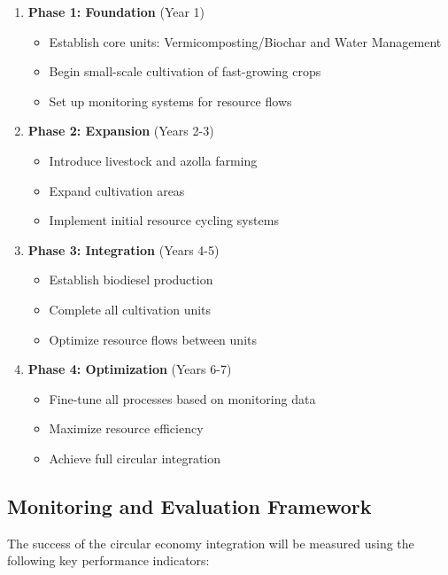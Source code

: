 \begin{enumerate}
    \item \textbf{Phase 1: Foundation} (Year 1)
    \begin{itemize}
        \item Establish core units: Vermicomposting/Biochar and Water Management
        \item Begin small-scale cultivation of fast-growing crops
        \item Set up monitoring systems for resource flows
    \end{itemize}
    
    \item \textbf{Phase 2: Expansion} (Years 2-3)
    \begin{itemize}
        \item Introduce livestock and azolla farming
        \item Expand cultivation areas
        \item Implement initial resource cycling systems
    \end{itemize}
    
    \item \textbf{Phase 3: Integration} (Years 4-5)
    \begin{itemize}
        \item Establish biodiesel production
        \item Complete all cultivation units
        \item Optimize resource flows between units
    \end{itemize}
    
    \item \textbf{Phase 4: Optimization} (Years 6-7)
    \begin{itemize}
        \item Fine-tune all processes based on monitoring data
        \item Maximize resource efficiency
        \item Achieve full circular integration
    \end{itemize}
\end{enumerate}

\subsection{Monitoring and Evaluation Framework}

The success of the circular economy integration will be measured using the following key performance indicators:

